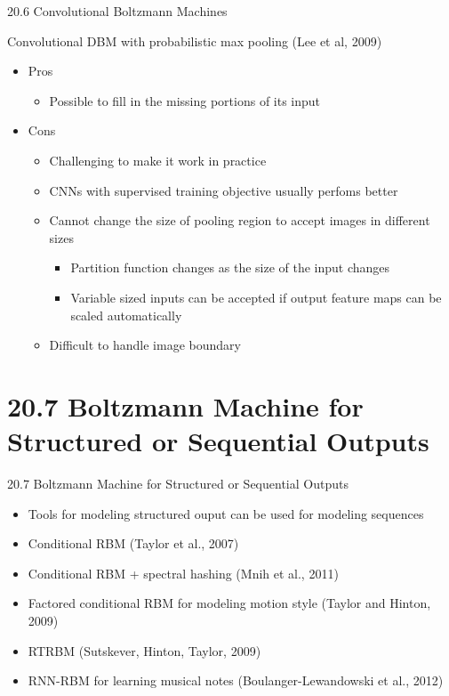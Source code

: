 \documentclass[dvipdfmx,presentation]{beamer}
\begin{document}
\begin{frame}[label={sec:orgheadline2}]{20.6 Convolutional Boltzmann Machines}
\begin{block}{Convolutional DBM with probabilistic max pooling (Lee et al, 2009)}
\begin{itemize}
\item Pros
\begin{itemize}
\item Possible to fill in the missing portions of its input
\end{itemize}
\item Cons
\begin{itemize}
\item Challenging to make it work in practice
\item CNNs with supervised training objective usually perfoms better
\item Cannot change the size of pooling region to accept images in different sizes
\begin{itemize}
\item Partition function changes as the size of the input changes
\item Variable sized inputs can be accepted if output feature maps can be scaled automatically
\end{itemize}
\item Difficult to handle image boundary
\end{itemize}
\end{itemize}
\end{block}
\end{frame}

\section{20.7 Boltzmann Machine for Structured or Sequential Outputs}
\label{sec:orgheadline5}
\begin{frame}[label={sec:orgheadline4}]{20.7 Boltzmann Machine for Structured or Sequential Outputs}
\begin{itemize}
\item Tools for modeling structured ouput can be used for modeling sequences
\item Conditional RBM (Taylor et al., 2007)
\item Conditional RBM + spectral hashing (Mnih et al., 2011)
\item Factored conditional RBM for modeling motion style (Taylor and Hinton, 2009)
\item RTRBM (Sutskever, Hinton, Taylor, 2009)
\item RNN-RBM for learning musical notes (Boulanger-Lewandowski et al., 2012)
\end{itemize}
\end{frame}
\end{document}
